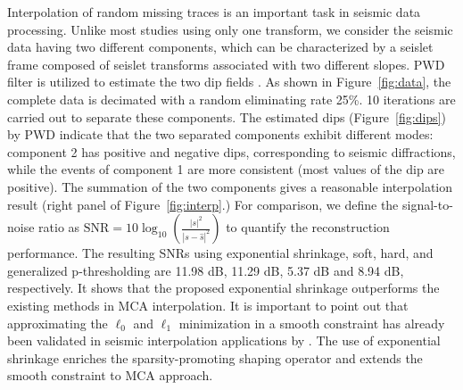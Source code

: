Interpolation of random missing traces is an important task in seismic data processing. Unlike most studies using only one transform, we consider the seismic data having two different components, which can be characterized by a seislet frame composed of seislet transforms associated with two different slopes. PWD filter is utilized to estimate the two dip fields \citep{fomel2002applications}. As shown in Figure~\ref{fig:data}, the complete data is decimated with a random eliminating rate 25\%. 10 iterations are carried out to separate these components. The estimated dips (Figure~\ref{fig:dips}) by PWD  indicate that the two separated components exhibit different modes: component 2 has positive and negative dips, corresponding to seismic diffractions, while the events of component 1 are more consistent (most values of the dip are positive). The summation of the two components gives a reasonable interpolation result (right panel of Figure~\ref{fig:interp}.) For comparison, we define the signal-to-noise ratio as $\mathrm{SNR}=10\log_{10}(\frac{|s|^2}{|s-\hat{s}|^2})$ to quantify the reconstruction performance. The resulting SNRs using exponential shrinkage, soft, hard, and generalized p-thresholding are 11.98 dB, 11.29 dB, 5.37 dB and 8.94 dB, respectively. It shows that the proposed exponential shrinkage outperforms the existing methods in MCA interpolation. It is important to point out that approximating the $\ell_0$ and $\ell_1$ minimization in a smooth constraint has already been validated in seismic interpolation applications by \cite{cao2011review}. The use of exponential shrinkage enriches the sparsity-promoting shaping operator and extends the smooth constraint to MCA approach. 








